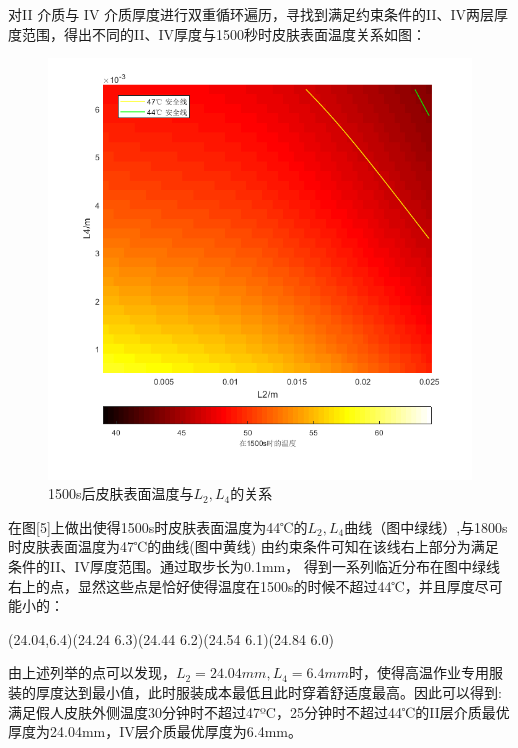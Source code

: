 \documentclass{cumcmthesis}
\begin{document}
        

            对II 介质与 IV 介质厚度进行双重循环遍历，寻找到满足约束条件的II、IV两层厚度范围，得出不同的II、IV厚度与1500秒时皮肤表面温度关系如图：
            \begin{figure}[ht] 
                \centering 
                \includegraphics[scale=0.9]{../figure/ques3HeatMapByL2L4.png} 
                \caption{1500s后皮肤表面温度与\(L_2,L_4\)的关系}\label{diff}    
            \end{figure}

            在图[5]上做出使得1500s时皮肤表面温度为44℃的\(L_2,L_4\)曲线（图中绿线）,与1800s时皮肤表面温度为47℃的曲线(图中黄线)
            由约束条件可知在该线右上部分为满足条件的II、IV厚度范围。通过取步长为0.1mm，
            得到一系列临近分布在图中绿线右上的点，显然这些点是恰好使得温度在1500s的时候不超过44℃，并且厚度尽可能小的：

            (24.04,6.4)\quad(24.24 6.3)\quad(24.44 6.2)\quad(24.54 6.1)\quad(24.84 6.0)
        
            由上述列举的点可以发现，\(L_2 = 24.04mm,L_4 = 6.4mm\)时，使得高温作业专用服装的厚度达到最小值，此时服装成本最低且此时穿着舒适度最高。因此可以得到:
            满足假人皮肤外侧温度30分钟时不超过47ºC，25分钟时不超过44℃的II层介质最优厚度为24.04mm，IV层介质最优厚度为6.4mm。
    
\end{document}

